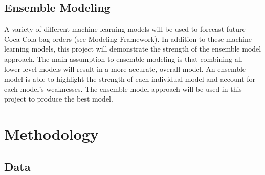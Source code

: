 \documentclass[12pt,oneside]{chicagocapstone}
\begin{document}
\section*{Ensemble Modeling}\label{ensemble-modeling}

A variety of different machine learning models will be used to forecast
future Coca-Cola bag orders (see Modeling Framework). In addition to
these machine learning models, this project will demonstrate the
strength of the ensemble model approach. The main assumption to ensemble
modeling is that combining all lower-level models will result in a more
accurate, overall model. An ensemble model is able to highlight the
strength of each individual model and account for each model's
weaknesses. The ensemble model approach will be used in this project to
produce the best model.

\newpage

\chapter*{Methodology}\label{methodology}

\section*{Data}\label{methodology-data}
\end{document}
